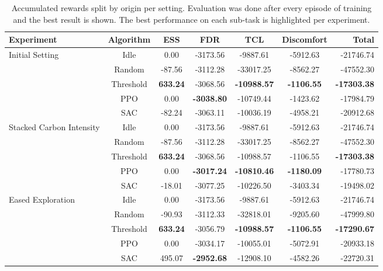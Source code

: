 \begin{table}[t]
\caption{Accumulated rewards split by origin per setting. Evaluation was done after every episode of training and the best result is shown. The best performance on each sub-task is highlighted per experiment.}
\label{tab:experiments}
\vskip 0.15in
\begin{center}
\begin{small}
\begin{sc}
\begin{tabular}{lcccccr}
\toprule
Experiment & Algorithm & ESS & FDR & TCL & Discomfort & Total \\
\midrule
\multirow{4}{*}{Initial Setting} 
    & Idle      & 0.00   & -3173.56 & -9887.61  & -5912.63  & -21746.74 \\
    & Random    & -87.56 & -3112.28 & -33017.25 & -8562.27  & -47552.30 \\
    & Threshold & \textbf{633.24} & -3068.56 & \textbf{-10988.57} & \textbf{-1106.55}  & \textbf{-17303.38} \\
    & PPO       & 0.00   & \textbf{-3038.80} & -10749.44 & -1423.62  & -17984.79 \\
    & SAC       & -82.24 & -3063.11 & -10036.19 & -4958.21  & -20912.68 \\
\midrule
\multirow{4}{*}{Stacked Carbon Intensity}
    & Idle      & 0.00   & -3173.56 & -9887.61  & -5912.63  & -21746.74 \\
    & Random    & -87.56 & -3112.28 & -33017.25 & -8562.27  & -47552.30 \\
    & Threshold & \textbf{633.24} & -3068.56 & -10988.57 & -1106.55  &  \textbf{-17303.38} \\
    & PPO       & 0.00   & \textbf{-3017.24} & \textbf{-10810.46} &  \textbf{-1180.09}  & -17780.73 \\
    & SAC       & -18.01 & -3077.25 & -10226.50 & -3403.34  & -19498.02 \\
\midrule
\multirow{4}{*}{Eased Exploration}
    & Idle      & 0.00   & -3173.56 & -9887.61  & -5912.63 & -21746.74 \\
    & Random    & -90.93 & -3112.33 & -32818.01 & -9205.60  & -47999.80 \\
    & Threshold & \textbf{633.24} & -3056.79 & \textbf{-10988.57} & \textbf{-1106.55} & \textbf{-17290.67} \\
    & PPO       & 0.00   & -3034.17 & -10055.01  & -5072.91 & -20933.18  \\
    & SAC       & 495.07 & \textbf{-2952.68} & -12908.10 & -4582.26 & -22720.31  \\

\end{tabular}
\end{sc}
\end{small}
\end{center}
\end{table}
